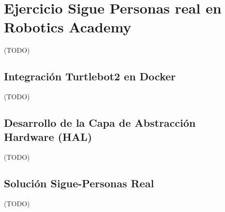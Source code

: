 \chapter{Ejercicio Sigue Personas real en Robotics Academy}
\label{cap:capitulo6}

(TODO)

\section{Integración Turtlebot2 en Docker}
\label{sec:integracion_turtlebot2_docker}

(TODO)

\section{Desarrollo de la Capa de Abstracción Hardware (HAL)}
\label{sec:turtlebot2_hal_real}

(TODO)

\section{Solución Sigue-Personas Real}
\label{sec:sigue_personas_real}

(TODO)